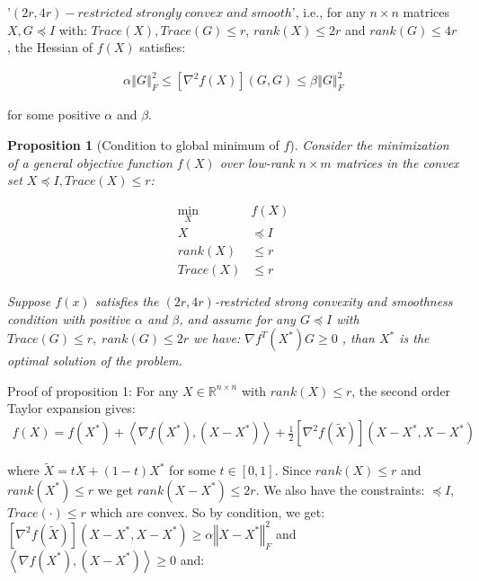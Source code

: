 \documentclass{article}
\newtheorem{proposition}{Proposition}
\begin{document}
'$(2r, 4r)-restricted\; strongly\; convex\; and\; smooth$', i.e., for any $n\times n$ matrices $X, G\preceq I$ with: $Trace\left(X\right), Trace\left(G\right)\le r$, $rank(X) \le 2r$ and $rank(G) \le 4r$, the Hessian of $f(X)$ satisfies:

\begin{align}
\alpha\left\Vert G\right\Vert^2_F\le \left[\nabla^2f\left(X\right)\right]\left(G,G\right)\le \beta\left\Vert G\right\Vert^2_F
\end{align}

for some positive $\alpha$ and $\beta$.

\begin{proposition}[Condition to global minimum of $f$]
Consider the minimization of a general objective function $f\left(X\right)$ over low-rank $n\times m$ matrices in the convex set $X \preceq I, Trace\left(X\right) \le r$:

\begin{align*}
    \min_{X} & f\left(X\right)\\
    X & \preceq I\\
    rank\left(X\right) & \le r\\
    Trace\left(X\right) & \le r
\end{align*}

Suppose $f\left(x\right)$ satisfies the $\left(2r,4r\right)$-restricted strong convexity and smoothness condition with positive $\alpha$ and $\beta$, and assume for any $G\preceq I$ with $Trace\left(G\right)\le r, \;rank\left(G\right)\le2r$ we have: $\nabla f^{T}\left(X^{*}\right)G\ge0$ , than $X^{*}$ is the optimal solution of the problem.

\end{proposition}

Proof of proposition 1: For any $X\in\mathbb{R}^{n\times n}$ with $rank\left(X\right)\le r$, the second order Taylor expansion gives:
\begin{align*}
    f\left(X\right)=f\left(X^{*}\right)+\left\langle \nabla f\left(X^{*}\right),\left(X-X^{*}\right)\right\rangle +\frac{1}{2}\left[\nabla^{2}f\left(\widetilde{X}\right)\right]\left(X-X^{*},X-X^{*}\right)
\end{align*}

where $\widetilde{X}=tX+\left(1-t\right)X^{*}$ for some $t\in\left[0,1\right]$. Since $rank\left(X\right)\le r$ and $rank\left(X^{*}\right)\le r$ we get $rank\left(X-X^{*}\right)\le2r$. We also have the constraints: $\preceq I$, $Trace\left(\cdot\right)\le r$ which are convex. So by condition, we get: $\left[\nabla^{2}f\left(\widetilde{X}\right)\right]\left(X-X^{*},X-X^{*}\right)\ge\alpha\left\Vert X-X^{*}\right\Vert _{F}^{2}$ and $\left\langle \nabla f\left(X^{*}\right),\left(X-X^{*}\right)\right\rangle \ge0$ and:
\end{document}

